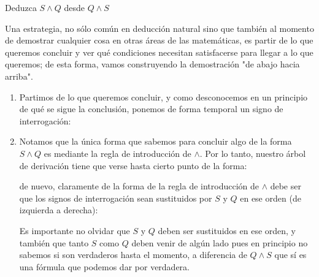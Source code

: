 \documentclass{article}
\begin{document}
\begin{example}
    Deduzca $S \land Q$ desde $Q \wedge S$

    Una estrategia, no sólo común en deducción natural sino que también al momento de demostrar cualquier cosa en otras áreas de las matemáticas, es partir de lo que queremos concluir y ver qué condiciones necesitan satisfacerse para llegar a lo que queremos; de esta forma, vamos construyendo la demostración "de abajo hacia arriba".

    \begin{enumerate}
        \item Partimos de lo que queremos concluir, y como desconocemos en un principio de qué se sigue la conclusión, ponemos de forma temporal un signo de interrogación:

            \begin{prooftree}
            \end{prooftree}

        \item Notamos que la única forma que sabemos para concluir algo de la forma $S \land Q$ es mediante la regla de introducción de $\land$. Por lo tanto,
        nuestro árbol de derivación tiene que verse hasta cierto punto de la forma:

            \begin{prooftree}
            \end{prooftree}

        de nuevo, claramente de la forma de la regla de introducción de $\land$ debe ser que los signos de interrogación sean sustituidos por $S$ y $Q$ en ese orden (de izquierda a derecha):

        \begin{prooftree}
        \end{prooftree}

        Es importante no olvidar que $S$ y $Q$ deben ser sustituidos en ese orden, y también que tanto $S$ como $Q$ deben venir de algún lado pues en principio no sabemos si son verdaderos hasta el momento, a diferencia de $Q \land S$ que sí es una fórmula que podemos dar por verdadera.


\end{enumerate}
\end{example}
\end{document}

